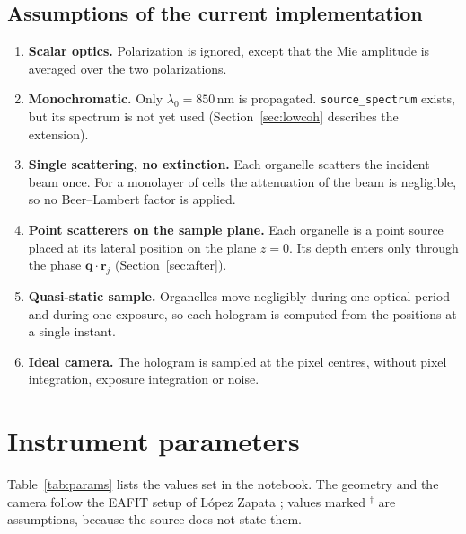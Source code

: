 \documentclass[11pt,a4paper]{article}
\newcommand{\vr}{\mathbf{r}}
\newcommand{\vq}{\mathbf{q}}
\newcommand{\nm}{\,\mathrm{nm}}
\newcommand{\code}[1]{\texttt{\small #1}}
\begin{document}
\subsection{Assumptions of the current implementation}
\label{sec:assumptions}

\begin{enumerate}[label=(A\arabic*)]
  \item \textbf{Scalar optics.} Polarization is ignored, except that the Mie
        amplitude is averaged over the two polarizations.
  \item \textbf{Monochromatic.} Only $\lambda_0 = 850\nm$ is propagated.
        \code{source\_spectrum} exists, but its spectrum is not yet used
        (Section~\ref{sec:lowcoh} describes the extension).
  \item \textbf{Single scattering, no extinction.} Each organelle scatters the
        incident beam once. For a monolayer of cells the attenuation of the
        beam is negligible, so no Beer--Lambert factor is applied.
  \item \textbf{Point scatterers on the sample plane.} Each organelle is a
        point source placed at its lateral position on the plane $z=0$. Its
        depth enters only through the phase $\vq\cdot\vr_j$
        (Section~\ref{sec:after}).
  \item \textbf{Quasi-static sample.} Organelles move negligibly during one
        optical period and during one exposure, so each hologram is computed
        from the positions at a single instant.
  \item \textbf{Ideal camera.} The hologram is sampled at the pixel centres,
        without pixel integration, exposure integration or noise.
\end{enumerate}

\section{Instrument parameters}
\label{sec:params}

Table~\ref{tab:params} lists the values set in the notebook. The geometry and
the camera follow the EAFIT setup of L\'opez Zapata
\cite[\S3.1.4--3.1.6]{lopez2026}; values marked $^\dagger$ are assumptions,
because the source does not state them.
\end{document}
